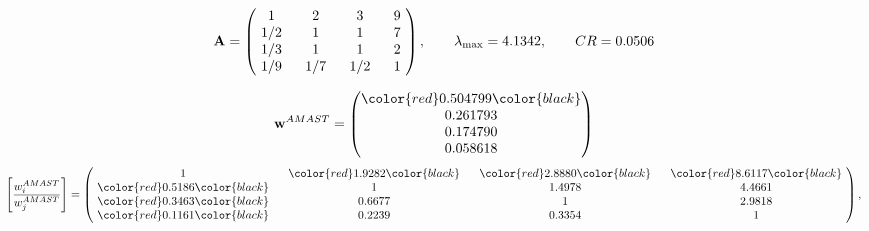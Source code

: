 \begin{example}
\begin{equation*}
\mathbf{A} =
\begin{pmatrix}
$\,\,$ 1 $\,\,$ & $\,\,$2$\,\,$ & $\,\,$3$\,\,$ & $\,\,$9 $\,\,$ \\
$\,\,$ 1/2$\,\,$ & $\,\,$ 1 $\,\,$ & $\,\,$1$\,\,$ & $\,\,$7 $\,\,$ \\
$\,\,$ 1/3$\,\,$ & $\,\,$ 1 $\,\,$ & $\,\,$ 1 $\,\,$ & $\,\,$2 $\,\,$ \\
$\,\,$ 1/9$\,\,$ & $\,\,$ 1/7$\,\,$ & $\,\,$ 1/2$\,\,$ & $\,\,$ 1  $\,\,$ \\
\end{pmatrix},
\qquad
\lambda_{\max} =
4.1342,
\qquad
CR = 0.0506
\end{equation*}

\begin{equation*}
\mathbf{w}^{AMAST} =
\begin{pmatrix}
\color{red} 0.504799\color{black} \\
0.261793\\
0.174790\\
0.058618
\end{pmatrix}\end{equation*}
\begin{equation*}
\left[ \frac{{w}^{AMAST}_i}{{w}^{AMAST}_j} \right] =
\begin{pmatrix}
$\,\,$ 1 $\,\,$ & $\,\,$\color{red} 1.9282\color{black} $\,\,$ & $\,\,$\color{red} 2.8880\color{black} $\,\,$ & $\,\,$\color{red} 8.6117\color{black} $\,\,$ \\
$\,\,$\color{red} 0.5186\color{black} $\,\,$ & $\,\,$ 1 $\,\,$ & $\,\,$1.4978$\,\,$ & $\,\,$4.4661  $\,\,$ \\
$\,\,$\color{red} 0.3463\color{black} $\,\,$ & $\,\,$0.6677$\,\,$ & $\,\,$ 1 $\,\,$ & $\,\,$2.9818 $\,\,$ \\
$\,\,$\color{red} 0.1161\color{black} $\,\,$ & $\,\,$0.2239$\,\,$ & $\,\,$0.3354$\,\,$ & $\,\,$ 1  $\,\,$ \\
\end{pmatrix},
\end{equation*}


\end{example}

